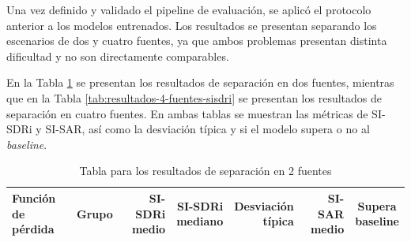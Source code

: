 Una vez definido y validado el pipeline de evaluación, se aplicó el protocolo anterior a los modelos entrenados. Los resultados se presentan separando los escenarios de dos y cuatro fuentes, ya que ambos problemas presentan distinta dificultad y no son directamente comparables.

En la Tabla \ref{tab:resultados-2-fuentes-sisdri} se presentan los resultados de separación en dos fuentes, mientras que en la Tabla \ref{tab:resultados-4-fuentes-sisdri} se presentan los resultados de separación en cuatro fuentes. En ambas tablas se muestran las métricas de SI-SDRi y SI-SAR, así como la desviación típica y si el modelo supera o no al \textit{baseline}.

\begin{table}[H]
    \centering
    \caption{Tabla para los resultados de separación en 2 fuentes }
    \label{tab:resultados-2-fuentes-sisdri}

    \begin{adjustbox}{center,max width=\textwidth}
        \begin{tabular}{llrrrrc}
            \toprule
            \makecell{\textbf{Función}\\\textbf{de pérdida}} &
            \textbf{Grupo} &
            \makecell{\textbf{SI-SDRi}\\\textbf{medio}} &
            \makecell{\textbf{SI-SDRi}\\\textbf{mediano}} &
            \makecell{\textbf{Desviación}\\\textbf{típica}} &
            \makecell{\textbf{SI-SAR}\\\textbf{medio}} &
            \makecell{\textbf{Supera}\\\textbf{baseline}} \\
            \midrule


\end{tabular}
\end{adjustbox}
\end{table}
